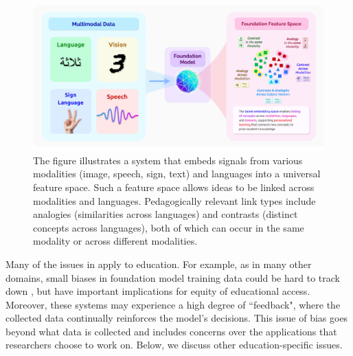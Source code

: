 \begin{figure}[t]
    \centering
    \includegraphics[width=\linewidth]{applications/education_figs/Education_multimodal.png}
    \caption{The figure illustrates a system that embeds signals from various modalities (image, speech, sign, text) and languages into a universal feature space. Such a feature space allows ideas to be linked across modalities and languages. Pedagogically relevant link types include analogies (similarities across languages) and contrasts (distinct concepts across languages), both of which can occur in the same modality or across different modalities.}
    \label{fig:education_mm}
\end{figure}

Many of the issues in  apply to education. For example, as in many other domains, small biases in foundation model training data could be hard to track down \cite{dixon2018bias, bolukbasi2016}, but have important implications for equity of educational access. Moreover, these systems may experience a high degree of ``feedback", where the collected data continually reinforces the model's decisions. 
This issue of bias goes beyond what data is collected and includes concerns over the applications that researchers choose to work on. 
Below, we discuss other education-specific  issues.




